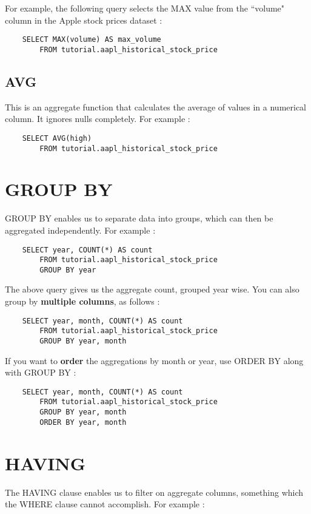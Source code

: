 \documentclass[12pt, letterpaper]{article}
\begin{document}
For example, the following query selects the MAX value from the ``volume" column in the Apple stock prices dataset : 

\begin{verbatim}
    SELECT MAX(volume) AS max_volume
        FROM tutorial.aapl_historical_stock_price
\end{verbatim}

\subsection{AVG}
This is an aggregate function that calculates the average of values in a numerical column. It ignores nulls completely. For example : 

\begin{verbatim}
    SELECT AVG(high)
        FROM tutorial.aapl_historical_stock_price
\end{verbatim}


\section{GROUP BY}
GROUP BY enables us to separate data into groups, which can then be aggregated independently. For example : 

\begin{verbatim}
    SELECT year, COUNT(*) AS count
        FROM tutorial.aapl_historical_stock_price
        GROUP BY year
\end{verbatim}

The above query gives us the aggregate count, grouped year wise. You can also group by \textbf{multiple columns}, as follows : 

\begin{verbatim}
    SELECT year, month, COUNT(*) AS count
        FROM tutorial.aapl_historical_stock_price
        GROUP BY year, month
\end{verbatim}

If you want to \textbf{order} the aggregations by month or year, use ORDER BY along with GROUP BY : 

\begin{verbatim}
    SELECT year, month, COUNT(*) AS count
        FROM tutorial.aapl_historical_stock_price
        GROUP BY year, month
        ORDER BY year, month
\end{verbatim}


\section{HAVING}
The HAVING clause enables us to filter on aggregate columns, something which the WHERE clause cannot accomplish. For example : 
\end{document}
